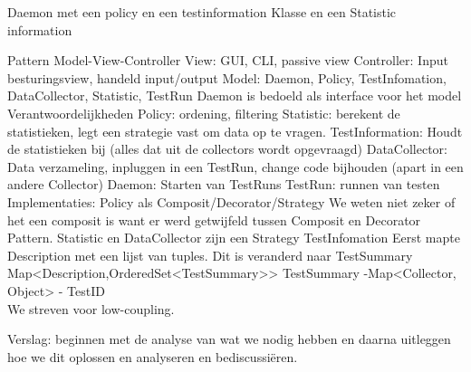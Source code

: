 \documentclass[i2]{oss}
\begin{document}
Daemon met een policy en een testinformation Klasse en een Statistic information 

Pattern Model-View-Controller
View:  GUI, CLI, passive view
Controller:
Input besturingsview, handeld input/output
Model: Daemon, Policy, TestInfomation, DataCollector, Statistic, TestRun
Daemon is bedoeld als interface voor het model
\\
Verantwoordelijkheden
Policy: ordening, filtering
Statistic: berekent de statistieken, legt een strategie vast om data op te vragen.
TestInformation:  Houdt de statistieken bij (alles dat uit de collectors wordt opgevraagd)
DataCollector: Data verzameling, inpluggen in een TestRun, change code bijhouden (apart in een andere Collector)
Daemon:  Starten van TestRuns
TestRun:  runnen van testen
\\
Implementaties:
Policy als Composit/Decorator/Strategy
We weten niet zeker of het een composit is want er werd getwijfeld tussen Composit en Decorator Pattern. 
Statistic en DataCollector zijn een Strategy
TestInfomation
Eerst mapte Description met een lijst van tuples. Dit is veranderd naar TestSummary
Map\textless Description,OrderedSet\textless TestSummary\textgreater \textgreater
	TestSummary	-Map\textless Collector, Object\textgreater
			- TestID \\
We streven voor low-coupling. 

Verslag: beginnen met de analyse van wat we nodig hebben en daarna uitleggen hoe we dit oplossen en analyseren en bediscussi\"eren.

 
\end{document}
